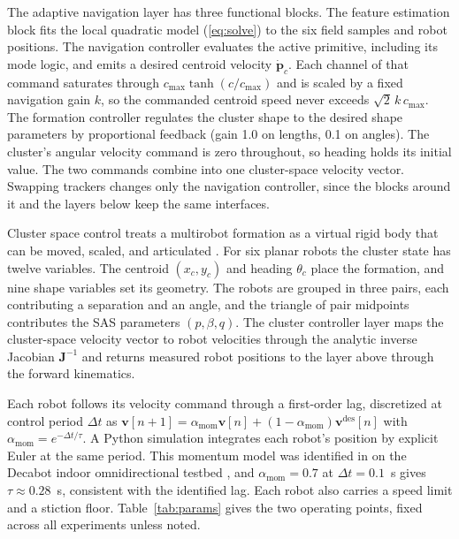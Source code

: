 \documentclass[lettersize,journal]{IEEEtran}
\begin{document}
The adaptive navigation layer has three functional blocks. The feature
estimation block fits the local quadratic model (\ref{eq:solve}) to the
six field samples and robot positions. The navigation controller evaluates
the active primitive, including its mode logic, and emits a desired
centroid velocity $\dot{\mathbf{p}}_c$. Each channel of that command
saturates through $c_{\max}\tanh(c/c_{\max})$ and is scaled by a fixed
navigation gain $k$, so the commanded centroid speed never exceeds
$\sqrt{2}\,k\,c_{\max}$. The formation controller regulates the cluster
shape to the desired shape parameters by proportional feedback (gain 1.0 on
lengths, 0.1 on angles). The cluster's angular velocity command is zero
throughout, so heading holds its initial value. The two
commands combine into one cluster-space velocity vector. Swapping
trackers changes only the navigation controller, since the blocks around
it and the layers below keep the same interfaces.

Cluster space control treats a multirobot formation as a virtual rigid
body that can be moved, scaled, and articulated \cite{31}. For six planar
robots the cluster state has twelve variables. The centroid $(x_c, y_c)$
and heading $\theta_c$ place the formation, and nine shape variables set
its geometry. The robots are grouped in three pairs, each contributing a
separation and an angle, and the triangle of pair midpoints contributes
the SAS parameters $(p, \beta, q)$. The cluster controller layer maps the
cluster-space velocity vector to robot velocities through the analytic
inverse Jacobian $\mathbf{J}^{-1}$ and returns measured robot positions to
the layer above through the forward kinematics.

Each robot follows its velocity command through a first-order lag,
discretized at control period $\Delta t$ as
$\mathbf{v}[n+1] = \alpha_{\text{mom}}\mathbf{v}[n] + (1 -
\alpha_{\text{mom}})\mathbf{v}^{\text{des}}[n]$ with
$\alpha_{\text{mom}} = e^{-\Delta t/\tau}$. A Python simulation integrates
each robot's position by explicit Euler at the same period. This momentum model was
identified in \cite{8} on the Decabot indoor omnidirectional testbed
\cite{33,34}, and $\alpha_{\text{mom}} = 0.7$ at $\Delta t = 0.1$~s gives
$\tau \approx 0.28$~s, consistent with the identified lag. Each robot also
carries a speed limit and a stiction floor. Table~\ref{tab:params} gives
the two operating points, fixed across all experiments unless noted.
\end{document}
